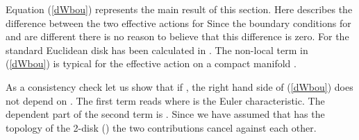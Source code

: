 \documentclass[a4paper,12pt]{article}
\begin{document}
Equation (\ref{dWbou}) represents the main result of this section.
Here \coordHE{} describes the difference between the two effective
actions for \coordHE{} Since the boundary conditions for
\myHighlight{$\Delta_+$}\coordHE{} and \myHighlight{$\Delta_-$}\coordHE{} are different there is no reason
to believe that this difference is zero. For the standard
Euclidean disk \coordHE{} has been calculated in 
\cite{Bordag:1996zc,Dowker:1996bh}. The non-local term
in (\ref{dWbou}) is typical for the effective action
on a compact manifold \cite{Dowker:1994rt}.

As a consistency check
let us show that if \coordHE{}, the right hand side
of (\ref{dWbou}) does not depend on \coordHE{}. The first term
reads \coordHE{} where \myHighlight{$\chi$}\coordHE{} is the Euler
characteristic. The \coordHE{} dependent part of the second
term is \coordHE{}. Since we have assumed that \coordHE{}
has the topology of the 2-disk (\coordHE{})  the two contributions
cancel against each other.
\end{document}
